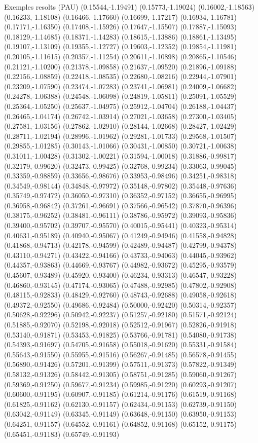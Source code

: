 \documentclass[11pt,a4paper]{article}
\begin{document}
\begin{fmex}{Exemples resolts (PAU)}
(0.15544,-1.19491) (0.15773,-1.19024) (0.16002,-1.18563) (0.16233,-1.18108) (0.16466,-1.17660) (0.16699,-1.17217) (0.16934,-1.16781) (0.17171,-1.16350) (0.17408,-1.15926) (0.17647,-1.15507) (0.17887,-1.15093) (0.18129,-1.14685) (0.18371,-1.14283) (0.18615,-1.13886) (0.18861,-1.13495) (0.19107,-1.13109) (0.19355,-1.12727) (0.19603,-1.12352) (0.19854,-1.11981) (0.20105,-1.11615) (0.20357,-1.11254) (0.20611,-1.10898) (0.20865,-1.10546) (0.21121,-1.10200) (0.21378,-1.09858) (0.21637,-1.09520) (0.21896,-1.09188) (0.22156,-1.08859) (0.22418,-1.08535) (0.22680,-1.08216) (0.22944,-1.07901) (0.23209,-1.07590) (0.23474,-1.07283) (0.23741,-1.06981) (0.24009,-1.06682) (0.24278,-1.06388) (0.24548,-1.06098) (0.24819,-1.05811) (0.25091,-1.05529) (0.25364,-1.05250) (0.25637,-1.04975) (0.25912,-1.04704) (0.26188,-1.04437) (0.26465,-1.04174) (0.26742,-1.03914) (0.27021,-1.03658) (0.27300,-1.03405) (0.27581,-1.03156) (0.27862,-1.02910) (0.28144,-1.02668) (0.28427,-1.02429) (0.28711,-1.02194) (0.28996,-1.01962) (0.29281,-1.01733) (0.29568,-1.01507) (0.29855,-1.01285) (0.30143,-1.01066) (0.30431,-1.00850) (0.30721,-1.00638) (0.31011,-1.00428) (0.31302,-1.00221) (0.31594,-1.00018) (0.31886,-0.99817) (0.32179,-0.99620) (0.32473,-0.99425) (0.32768,-0.99234) (0.33063,-0.99045) (0.33359,-0.98859) (0.33656,-0.98676) (0.33953,-0.98496) (0.34251,-0.98318) (0.34549,-0.98144) (0.34848,-0.97972) (0.35148,-0.97802) (0.35448,-0.97636) (0.35749,-0.97472) (0.36050,-0.97310) (0.36352,-0.97152) (0.36655,-0.96995) (0.36958,-0.96842) (0.37261,-0.96691) (0.37566,-0.96542) (0.37870,-0.96396) (0.38175,-0.96252) (0.38481,-0.96111) (0.38786,-0.95972) (0.39093,-0.95836) (0.39400,-0.95702) (0.39707,-0.95570) (0.40015,-0.95441) (0.40323,-0.95314) (0.40631,-0.95189) (0.40940,-0.95067) (0.41249,-0.94946) (0.41558,-0.94828) (0.41868,-0.94713) (0.42178,-0.94599) (0.42489,-0.94487) (0.42799,-0.94378) (0.43110,-0.94271) (0.43422,-0.94166) (0.43733,-0.94063) (0.44045,-0.93962) (0.44357,-0.93863) (0.44669,-0.93767) (0.44982,-0.93672) (0.45295,-0.93579) (0.45607,-0.93489) (0.45920,-0.93400) (0.46234,-0.93313) (0.46547,-0.93228) (0.46860,-0.93145) (0.47174,-0.93065) (0.47488,-0.92985) (0.47802,-0.92908) (0.48115,-0.92833) (0.48429,-0.92760) (0.48743,-0.92688) (0.49058,-0.92618) (0.49372,-0.92550) (0.49686,-0.92484) (0.50000,-0.92420) (0.50314,-0.92357) (0.50628,-0.92296) (0.50942,-0.92237) (0.51257,-0.92180) (0.51571,-0.92124) (0.51885,-0.92070) (0.52198,-0.92018) (0.52512,-0.91967) (0.52826,-0.91918) (0.53140,-0.91871) (0.53453,-0.91825) (0.53766,-0.91781) (0.54080,-0.91738) (0.54393,-0.91697) (0.54705,-0.91658) (0.55018,-0.91620) (0.55331,-0.91584) (0.55643,-0.91550) (0.55955,-0.91516) (0.56267,-0.91485) (0.56578,-0.91455) (0.56890,-0.91426) (0.57201,-0.91399) (0.57511,-0.91373) (0.57822,-0.91349) (0.58132,-0.91326) (0.58442,-0.91305) (0.58751,-0.91285) (0.59060,-0.91267) (0.59369,-0.91250) (0.59677,-0.91234) (0.59985,-0.91220) (0.60293,-0.91207) (0.60600,-0.91195) (0.60907,-0.91185) (0.61214,-0.91176) (0.61519,-0.91168) (0.61825,-0.91162) (0.62130,-0.91157) (0.62434,-0.91153) (0.62739,-0.91150) (0.63042,-0.91149) (0.63345,-0.91149) (0.63648,-0.91150) (0.63950,-0.91153) (0.64251,-0.91157) (0.64552,-0.91161) (0.64852,-0.91168) (0.65152,-0.91175) (0.65451,-0.91183) (0.65749,-0.91193) 
\end{fmex}
\end{document}
